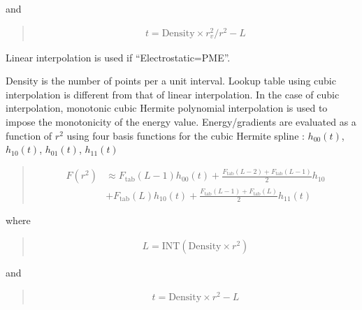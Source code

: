 \documentclass[a4paper,11pt,oneside,english]{sphinxmanual}
\begin{document}
and
\begin{quote}

\vspace{-5mm}
\begin{equation*}
\begin{split}t=\text{Density} \times r_v^2/r^2-L\end{split}
\end{equation*}
\vspace{-3mm}
\end{quote}

Linear interpolation is used if “Electrostatic=PME”.

Density is the number of points per a unit interval. Lookup table using cubic interpolation is different from that of linear interpolation. In the case of cubic interpolation, monotonic cubic Hermite polynomial  interpolation is used to impose the monotonicity of the energy value. Energy/gradients are evaluated as a function of \(r^2\)  using four basis functions for the cubic Hermite spline : \(h_{00}(t)\), \(h_{10}(t)\), \(h_{01}(t)\), \(h_{11}(t)\)
\begin{quote}

\vspace{-5mm}
\begin{equation*}
\begin{split}F(r^2) & \approx F_{\text{tab}}(L-1)h_{00}(t)+\frac{F_{\text{tab}}(L-2) + F_{\text{tab}}(L-1)}{2} h_{10} \\ & + F_{\text{tab}}(L)h_{10}(t) + \frac{F_{\text{tab}}(L-1)+F_{\text{tab}}(L)}{2} h_{11}(t)\end{split}
\end{equation*}
\vspace{-3mm}
\end{quote}

where
\begin{quote}

\vspace{-5mm}
\begin{equation*}
\begin{split}L=\text{INT}(\text{Density} \times r^2)\end{split}
\end{equation*}
\vspace{-3mm}
\end{quote}

and
\begin{quote}

\vspace{-5mm}
\begin{equation*}
\begin{split}t=\text{Density} \times r^2-L\end{split}
\end{equation*}
\vspace{-3mm}
\end{quote}
\end{document}
